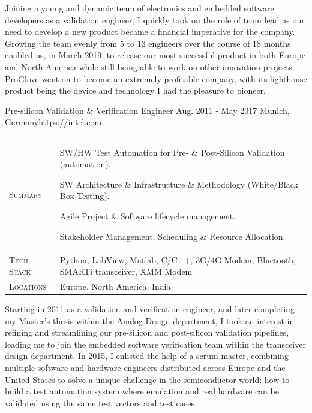 \documentclass[10pt,a4paper]{moderncv}
\begin{document}
  \begin{minipage}{\textwidth}
    \small
    Joining a young and dynamic team of electronics and embedded software developers as a validation engineer, I quickly took on the role of team lead as our need to develop a new product became a financial imperative for the company. Growing the team evenly from 5 to 13 engineers over the course of 18 months enabled us, in March 2019, to release our most successful product in both Europe and North America while still being able to work on other innovation projects. ProGlove went on to become an extremely profitable company, with its lighthouse product being the device and technology I had the pleasure to pioneer.
  \end{minipage}



  {Pre-silicon Validation \& Verification Engineer}
  {Aug. 2011 - May 2017}
  {Munich, Germany}{https://intel.com}

  \begin{tabularx}{\textwidth}{>{\scshape}l@{\hskip 3.5mm}L}
    Summary & SW/HW Test Automation for Pre- \& Post-Silicon Validation (automation).
    \par SW Architecture \& Infrastructure \& Methodology (White/Black Box Testing).
    \par Agile Project \& Software lifecycle management. 
    \par Stakeholder Management, Scheduling \& Resource Allocation.\\
    Tech. Stack & Python, LabView, Matlab, C/C++, 3G/4G Modem, Bluetooth, SMARTi transceiver, XMM Modem\\
    Locations & Europe, North America, India\\
  \end{tabularx}

  \vspace{1.5em}
  
  \begin{minipage}{\textwidth}
    \small
    Starting in 2011 as a validation and verification engineer, and later completing my Master's thesis within the Analog Design department, I took an interest in refining and streamlining our pre-silicon and post-silicon validation pipelines, leading me to join the embedded software verification team within the transceiver design department. In 2015, I enlisted the help of a scrum master, combining multiple software and hardware engineers distributed across Europe and the United States to solve a unique challenge in the semiconductor world: how to build a test automation system where emulation and real hardware can be validated using the same test vectors and test cases.
  \end{minipage}
\end{document}

